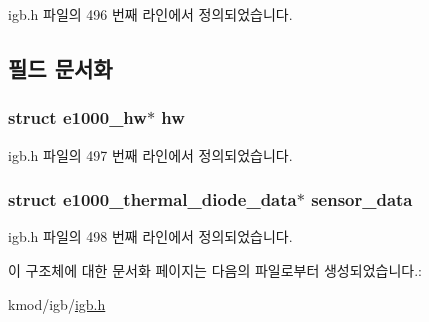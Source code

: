 igb.\+h 파일의 496 번째 라인에서 정의되었습니다.



\subsection{필드 문서화}
\subsubsection[{\texorpdfstring{hw}{hw}}]{\setlength{\rightskip}{0pt plus 5cm}struct {\bf e1000\+\_\+hw}$\ast$ hw}\hypertarget{structigb__therm__proc__data_ae0389b77e987f85762ff0d87ce4e76fc}{}\label{structigb__therm__proc__data_ae0389b77e987f85762ff0d87ce4e76fc}


igb.\+h 파일의 497 번째 라인에서 정의되었습니다.

\subsubsection[{\texorpdfstring{sensor\+\_\+data}{sensor_data}}]{\setlength{\rightskip}{0pt plus 5cm}struct {\bf e1000\+\_\+thermal\+\_\+diode\+\_\+data}$\ast$ sensor\+\_\+data}\hypertarget{structigb__therm__proc__data_a18e5c745a0c698a5c948b2020bc5f8f5}{}\label{structigb__therm__proc__data_a18e5c745a0c698a5c948b2020bc5f8f5}


igb.\+h 파일의 498 번째 라인에서 정의되었습니다.



이 구조체에 대한 문서화 페이지는 다음의 파일로부터 생성되었습니다.\+:\begin{DoxyCompactItemize}
\item 
kmod/igb/\hyperlink{kmod_2igb_2igb_8h}{igb.\+h}\end{DoxyCompactItemize}
